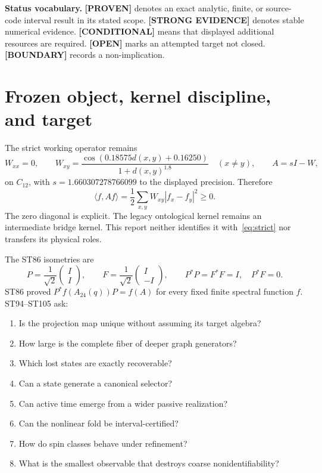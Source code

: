\documentclass[11pt,a4paper]{article}
\newcommand{\proven}{\textcolor{green!40!black}{\textbf{[PROVEN]}}}
\newcommand{\strong}{\textcolor{blue!70!black}{\textbf{[STRONG EVIDENCE]}}}
\newcommand{\conditional}{\textcolor{violet!65!black}{\textbf{[CONDITIONAL]}}}
\newcommand{\openstatus}{\textcolor{red!72!black}{\textbf{[OPEN]}}}
\newcommand{\statusboundary}{\textcolor{orange!80!black}{\textbf{[BOUNDARY]}}}
\begin{document}
\textbf{Status vocabulary.} \proven{} denotes an exact analytic, finite, or source-code interval result in its stated scope. \strong{} denotes stable numerical evidence. \conditional{} means that displayed additional resources are required. \openstatus{} marks an attempted target not closed. \statusboundary{} records a non-implication.

\tableofcontents
\newpage

\section{Frozen object, kernel discipline, and target}

The strict working operator remains
\begin{equation}
W_{xx}=0,\qquad W_{xy}=\frac{\cos(0.18575d(x,y)+0.16250)}{1+d(x,y)^{1.8}}\quad(x\ne y),
\qquad A=sI-W,
\label{eq:strict}
\end{equation}
on $C_{12}$, with $s=1.660307278766099$ to the displayed precision. Therefore
\[
\langle f,Af\rangle=\frac12\sum_{x,y}W_{xy}|f_x-f_y|^2\ge0.
\]
The zero diagonal is explicit. The legacy ontological kernel remains an intermediate bridge kernel. This report neither identifies it with~\eqref{eq:strict} nor transfers its physical roles.

The ST86 isometries are
\[
P=\frac1{\sqrt2}\begin{pmatrix}I\\I\end{pmatrix},\qquad
F=\frac1{\sqrt2}\begin{pmatrix}I\\-I\end{pmatrix},
\qquad P^*P=F^*F=I,\quad P^*F=0.
\]
ST86 proved $P^*f(A_{24}(q))P=f(A)$ for every fixed finite spectral function $f$. ST94--ST105 ask:
\begin{enumerate}
\item Is the projection map unique without assuming its target algebra?
\item How large is the complete fiber of deeper graph generators?
\item Which lost states are exactly recoverable?
\item Can a state generate a canonical selector?
\item Can active time emerge from a wider passive realization?
\item Can the nonlinear fold be interval-certified?
\item How do spin classes behave under refinement?
\item What is the smallest observable that destroys coarse nonidentifiability?
\end{enumerate}
\end{document}
